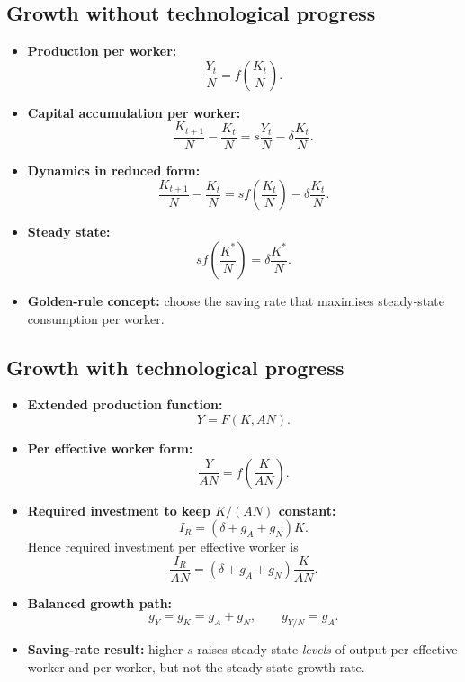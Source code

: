 \documentclass[12pt]{article}
\begin{document}
\subsection*{Growth without technological progress}
\begin{itemize}[leftmargin=1.5em]
\item \textbf{Production per worker:}
\[
\frac{Y_t}{N}=f\!\left(\frac{K_t}{N}\right).
\]
\item \textbf{Capital accumulation per worker:}
\[
\frac{K_{t+1}}{N}-\frac{K_t}{N}=s\frac{Y_t}{N}-\delta \frac{K_t}{N}.
\]
\item \textbf{Dynamics in reduced form:}
\[
\frac{K_{t+1}}{N}-\frac{K_t}{N}=s f\!\left(\frac{K_t}{N}\right)-\delta \frac{K_t}{N}.
\]
\item \textbf{Steady state:}
\[
s f\!\left(\frac{K^*}{N}\right)=\delta \frac{K^*}{N}.
\]
\item \textbf{Golden-rule concept:} choose the saving rate that maximises steady-state consumption per worker.
\end{itemize}

\subsection*{Growth with technological progress}
\begin{itemize}[leftmargin=1.5em]
\item \textbf{Extended production function:}
\[
Y=F(K,AN).
\]
\item \textbf{Per effective worker form:}
\[
\frac{Y}{AN}=f\!\left(\frac{K}{AN}\right).
\]
\item \textbf{Required investment to keep $K/(AN)$ constant:}
\[
I_R=(\delta+g_A+g_N)K.
\]
Hence required investment per effective worker is
\[
\frac{I_R}{AN}=(\delta+g_A+g_N)\frac{K}{AN}.
\]
\item \textbf{Balanced growth path:}
\[
g_Y=g_K=g_A+g_N, \qquad g_{Y/N}=g_A.
\]
\item \textbf{Saving-rate result:} higher $s$ raises steady-state \emph{levels} of output per effective worker and per worker, but not the steady-state growth rate.
\end{itemize}
\end{document}
